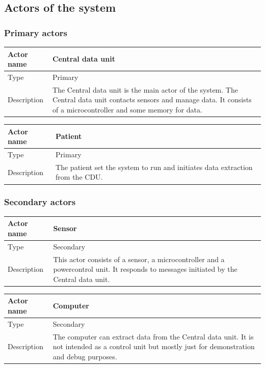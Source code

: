 \subsection{Actors of the system}

\subsubsection{Primary actors}

\begin{table}[H]
	\centering
	\begin{tabular}{|l|p{7cm}|}
	\hline
	Actor name & Central data unit \\ \hline
	Type & Primary \\ \hline
	Description & The Central data unit is the main actor of the system. The Central data unit contacts sensors and manage data. It consists of a microcontroller and some memory for data. \\ \hline
	\end{tabular}
\end{table}

\begin{table}[H]
	\centering
	\begin{tabular}{|l|p{7cm}|}
	\hline
	Actor name & Patient \\ \hline
	Type & Primary \\ \hline
	Description &  The patient set the system to run and initiates data extraction from the CDU.\\ \hline
	\end{tabular}
\end{table}

\subsubsection{Secondary actors}

\begin{table}[H]
	\centering
	\begin{tabular}{|l|p{7cm}|}
	\hline
	Actor name & Sensor \\ \hline
	Type & Secondary \\ \hline
	Description & This actor consists of a sensor, a microcontroller and a powercontrol unit. It responds to messages initiated by the Central data unit.\\ \hline
	\end{tabular}
\end{table}

\begin{table}[H]
	\centering
	\begin{tabular}{|l|p{7cm}|}
	\hline
	Actor name & Computer \\ \hline
	Type & Secondary \\ \hline
	Description & The computer can extract data from the Central data unit. It is not intended as a control unit but mostly just for demonstration and debug purposes. \\ \hline
	\end{tabular}
\end{table}






